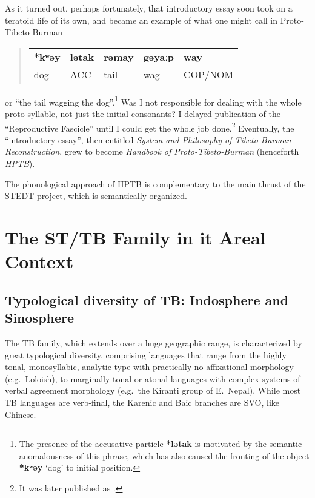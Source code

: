 As it turned out, perhaps fortunately, that introductory essay soon took on a teratoid life of its own, and became an example of what one might call in Proto-Tibeto-Burman 
\begin{quote}
\begin{center}
\begin{tabular}{l l l l l}
\textbf{*kʷəy} & \textbf{lətak} & \textbf{rəmay} & \textbf{gəyaːp} & \textbf{way}\\
dog & ACC & tail & wag & COP/NOM
\end{tabular}
\end{center}
\end{quote}
or “the tail wagging the dog”.\footnote{The presence of the accusative particle \textbf{*lətak} is motivated by the semantic anomalousness of this phrase, which has also caused the fronting of the object \textbf{*kʷəy} ‘dog’ to initial position.} Was I not responsible for dealing with the whole proto-syllable, not just the initial consonants? I delayed publication of the “Reproductive Fascicle” until I could get the whole job done.\footnote{It was later published
as \citealt{TBRS}.}
Eventually, the “introductory essay”, then entitled \textit{System and Philosophy of Tibeto-Burman Reconstruction}, grew to become \textit{Handbook of Proto-Tibeto-Burman} (henceforth \textit{HPTB}).


The phonological approach of HPTB is complementary to the main thrust of the STEDT project, which is semantically organized.

\section{The ST/TB Family in it Areal Context}

\subsection{Typological diversity of TB: Indosphere and Sinosphere}

The TB family, which extends over a huge geographic range, is characterized by great typological diversity, comprising languages that range from the highly tonal, monosyllabic, analytic type with practically no affixational morphology (e.g.\ Loloish), to marginally tonal or atonal languages with complex systems of verbal agreement morphology (e.g.\ the Kiranti group of E.\ Nepal). While most TB languages are verb-final, the Karenic and Baic branches are SVO, like Chinese.
 
